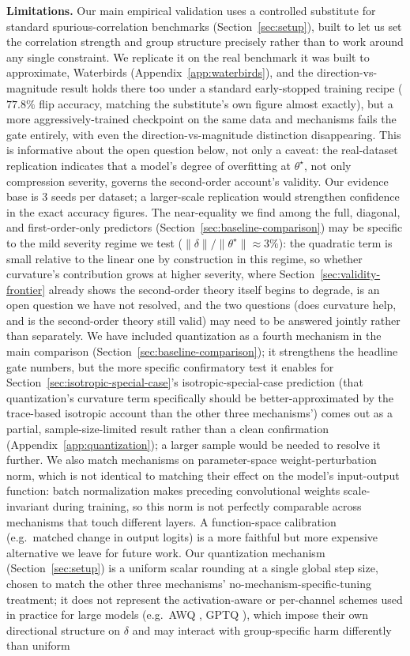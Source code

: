 \documentclass{article}
\newcommand{\theorig}{\theta^\star}
\begin{document}
\textbf{Limitations.} Our main empirical validation uses a controlled substitute for standard spurious-correlation benchmarks (Section~\ref{sec:setup}), built to let us set the correlation strength and group structure precisely rather than to work around any single constraint. We replicate it on the real benchmark it was built to approximate, Waterbirds (Appendix~\ref{app:waterbirds}), and the direction-vs-magnitude result holds there too under a standard early-stopped training recipe ($77.8\%$ flip accuracy, matching the substitute's own figure almost exactly), but a more aggressively-trained checkpoint on the same data and mechanisms fails the gate entirely, with even the direction-vs-magnitude distinction disappearing. This is informative about the open question below, not only a caveat: the real-dataset replication indicates that a model's degree of overfitting at $\theorig$, not only compression severity, governs the second-order account's validity. Our evidence base is $3$ seeds per dataset; a larger-scale replication would strengthen confidence in the exact accuracy figures. The near-equality we find among the full, diagonal, and first-order-only predictors (Section~\ref{sec:baseline-comparison}) may be specific to the mild severity regime we test ($\|\delta\|/\|\theta^\star\|\approx3\%$): the quadratic term is small relative to the linear one by construction in this regime, so whether curvature's contribution grows at higher severity, where Section~\ref{sec:validity-frontier} already shows the second-order theory itself begins to degrade, is an open question we have not resolved, and the two questions (does curvature help, and is the second-order theory still valid) may need to be answered jointly rather than separately. We have included quantization as a fourth mechanism in the main comparison (Section~\ref{sec:baseline-comparison}); it strengthens the headline gate numbers, but the more specific confirmatory test it enables for Section~\ref{sec:isotropic-special-case}'s isotropic-special-case prediction (that quantization's curvature term specifically should be better-approximated by the trace-based isotropic account than the other three mechanisms') comes out as a partial, sample-size-limited result rather than a clean confirmation (Appendix~\ref{app:quantization}); a larger sample would be needed to resolve it further. We also match mechanisms on parameter-space weight-perturbation norm, which is not identical to matching their effect on the model's input-output function: batch normalization makes preceding convolutional weights scale-invariant during training, so this norm is not perfectly comparable across mechanisms that touch different layers. A function-space calibration (e.g.\ matched change in output logits) is a more faithful but more expensive alternative we leave for future work. Our quantization mechanism (Section~\ref{sec:setup}) is a uniform scalar rounding at a single global step size, chosen to match the other three mechanisms' no-mechanism-specific-tuning treatment; it does not represent the activation-aware or per-channel schemes used in practice for large models (e.g.\ AWQ \citep{lin2024awq}, GPTQ \citep{frantar2023gptq}), which impose their own directional structure on $\delta$ and may interact with group-specific harm differently than uniform 
\end{document}
